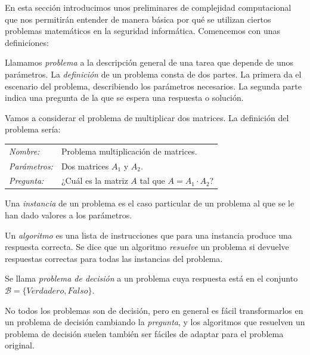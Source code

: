 En esta sección introducimos unos preliminares de complejidad computacional que nos permitirán entender de manera básica por qué se utilizan ciertos problemas matemáticos en la seguridad informática. Comencemos con unas definiciones:

\begin{definition}
	Llamamos \textit{problema} a la descripción general de una tarea que depende de unos parámetros. La \textit{definición} de un problema consta de dos partes. La primera da el escenario del problema, describiendo los parámetros necesarios. La segunda parte indica una pregunta de la que se espera una respuesta o solución.
\end{definition}

\begin{example}
	Vamos a considerar el problema de multiplicar dos matrices. La definición del problema sería:
	
	\begin{tabular}{|ll}
		\textit{Nombre:} & Problema multiplicación de matrices. \\
		\textit{Parámetros:} & Dos matrices $A_1$ y $A_2$. \\
		\textit{Pregunta:} & ¿Cuál es la matriz $A$ tal que $A=A_1 \cdot A_2$? \\
	\end{tabular}
\end{example}

\begin{definition}
   Una \textit{instancia} de un problema es el caso particular de un problema al que se le han dado valores a los parámetros.
\end{definition}


\begin{definition}	
	Un \textit{algoritmo} es una lista de instrucciones que para una instancia produce una respuesta correcta. Se dice que un algoritmo \textit{resuelve} un problema si devuelve respuestas correctas para todas las instancias del problema.
\end{definition}


\begin{definition}
	Se llama \textit{problema de decisión} a un problema cuya respuesta está en el conjunto $\mathcal{B}= \{Verdadero, Falso\}$.
\end{definition}


No todos los problemas son de decisión, pero en general es fácil transformarlos en un problema de decisión cambiando la \textit{pregunta}, y los algoritmos que resuelven un problema de decisión suelen también ser fáciles de adaptar para el problema original.

